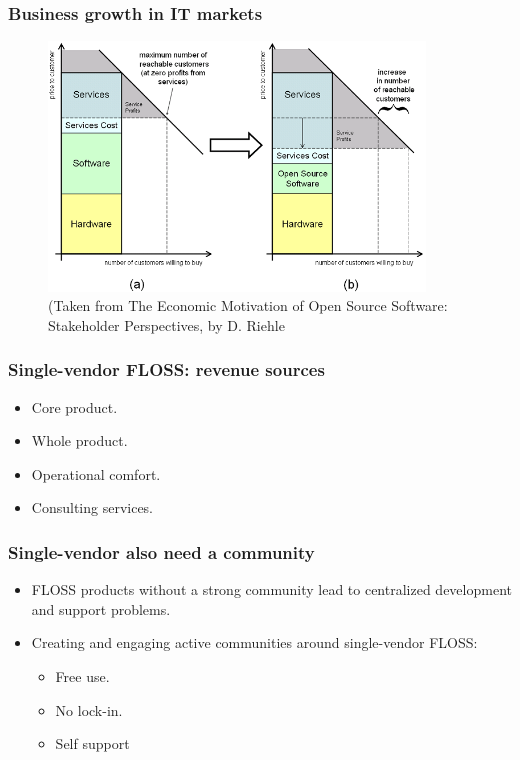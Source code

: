 
\begin{frame}
\frametitle{Business growth in IT markets}

\begin{center}
  \begin{figure}
    \includegraphics[width=10cm]{figs/business-growth-curve.png}
    \caption{(Taken from The Economic Motivation of Open Source 
Software: Stakeholder Perspectives, by D. Riehle} 
  \end{figure}
\end{center}

\end{frame}


\begin{frame}
\frametitle{Single-vendor FLOSS: revenue sources}
\begin{itemize}
  \item Core product.
  \item Whole product.
  \item Operational comfort.
  \item Consulting services.
\end{itemize}
\end{frame}


\begin{frame}
\frametitle{Single-vendor also need a community}
\begin{itemize}
  \item FLOSS products without a strong community lead to centralized
development and support problems.
  \item Creating and engaging active communities around single-vendor FLOSS:
  \begin{itemize}
   \item Free use.
   \item No lock-in.
   \item Self support
  \end{itemize}

\end{itemize}
\end{frame}

